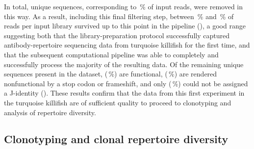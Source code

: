 In total,  unique sequences, corresponding to \,\% of input reads, were removed in this way. As a result, including this final filtering step, between \,\% and \,\% of reads per input library survived up to this point in the pipeline (), a good range suggesting both that the library-preparation protocol successfully captured antibody-repertoire sequencing data from turquoise killifish for the first time, and that the subsequent computational pipeline was able to completely and successfully process the majority of the resulting data. Of the remaining  unique sequences present in the dataset,  (\,\%) are functional,  (\,\%) are rendered nonfunctional by a stop codon or frameshift, and only  (\,\%) could not be assigned a J-identity (). These results confirm that the data from this first \igseq experiment in the turquoise killifish are of sufficient quality to proceed to clonotyping and analysis of repertoire diversity.

\subsection{Clonotyping and clonal repertoire diversity}
\label{sec:igseq_pilot_clones}

